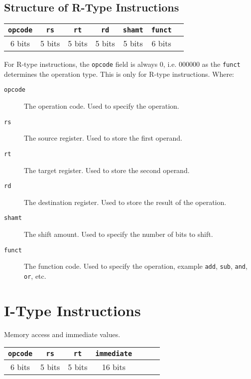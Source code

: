 \documentclass[12pt letter]{report}
\begin{document}
\subsection{Structure of R-Type Instructions}

\begin{table}[h!]
  \begin{center}
    \begin{tabular}{|c|c|c|c|c|c|c|}
      \hline
      \texttt{opcode} & \texttt{rs} & \texttt{rt} & \texttt{rd} & \texttt{shamt} & \texttt{funct} \\
      \hline
      6 bits          & 5 bits      & 5 bits      & 5 bits      & 5 bits         & 6 bits         \\
      \hline
    \end{tabular}
  \end{center}
\end{table}

For R-type instructions, the \texttt{opcode} field is always 0, i.e. $000000$ as the \texttt{funct} determines the operation type. This is only for R-type instructions.
Where:
\begin{description}
  \item[\texttt{opcode}] The operation code. Used to specify the operation.
  \item[\texttt{rs}] The source register. Used to store the first operand.
  \item[\texttt{rt}] The target register. Used to store the second operand.
  \item[\texttt{rd}] The destination register. Used to store the result of the operation.
  \item[\texttt{shamt}] The shift amount. Used to specify the number of bits to shift.
  \item[\texttt{funct}] The function code. Used to specify the operation, example \texttt{add}, \texttt{sub}, \texttt{and}, \texttt{or}, etc.
\end{description}

\section{I-Type Instructions}
Memory access and immediate values.

\begin{table}[h!]
  \begin{center}
    \begin{tabular}{|c|c|c|c|c|c|c|}
      \hline
      \texttt{opcode} & \texttt{rs} & \texttt{rt} & \texttt{immediate} \\
      \hline
      6 bits          & 5 bits      & 5 bits      & 16 bits            \\
      \hline
    \end{tabular}
  \end{center}
\end{table}
\end{document}
